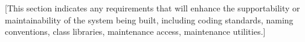 [This section indicates any requirements that 
will enhance the supportability or maintainability
of the system being built, including coding standards, 
naming conventions, class libraries, maintenance access, 
maintenance utilities.]
